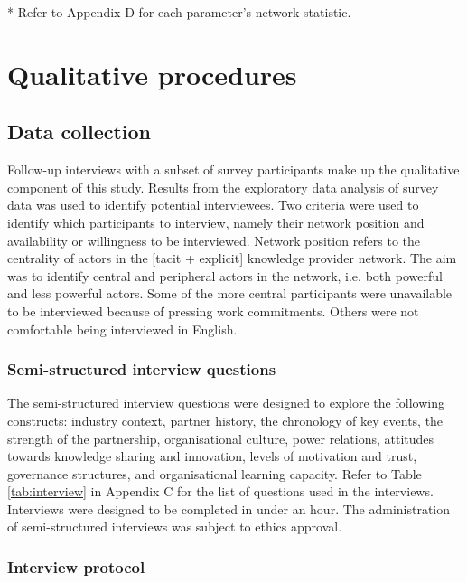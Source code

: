 \begin{table}[!htbp]
{\begin{threeparttable}
\begin{tablenotes}
\footnotesize
* Refer to Appendix D for each parameter's network statistic.
\end{tablenotes}

\end{threeparttable}
%
}
\end{table}

\section{Qualitative procedures}

\subsection{Data collection}

Follow-up interviews with a subset of survey participants make up the qualitative component of this study. Results from the exploratory data analysis of survey data was used to identify potential interviewees. Two criteria were used to identify which participants to interview, namely their network position and availability or willingness to be interviewed. Network position refers to the centrality of actors in the [tacit + explicit] knowledge provider network. The aim was to identify central and peripheral actors in the network, i.e. both powerful and less powerful actors. Some of the more central participants were unavailable to be interviewed because of pressing work commitments. Others were not comfortable being interviewed in English. 

\subsubsection{Semi-structured interview questions}

The semi-structured interview questions were designed to explore the following constructs: industry context, partner history, the chronology of key events, the strength of the partnership, organisational culture, power relations, attitudes towards knowledge sharing and innovation, levels of motivation and trust, governance structures, and organisational learning capacity. Refer to Table \ref{tab:interview} in Appendix C for the list of questions used in the interviews. Interviews were designed to be completed in under an hour. The administration of semi-structured interviews was subject to ethics approval. 

\subsubsection{Interview protocol}

